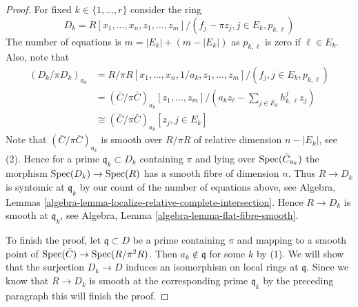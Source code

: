 \begin{proof}
\medskip\noindent
For fixed $k \in \{1, \ldots, r\}$ consider the ring
$$
D_k = R[x_1, \ldots, x_n, z_1, \ldots, z_m]/
(f_j - \pi z_j, j \in E_k, p_{k, \ell})
$$
The number of equations is $m = |E_k| + (m - |E_k|)$ as $p_{k, \ell}$
is zero if $\ell \in E_k$. Also, note that
\begin{align*}
(D_k/\pi D_k)_{a_k}
& =
R/\pi R[x_1, \ldots, x_n, 1/a_k, z_1, \ldots, z_m]/
(f_j, j \in E_k, p_{k, \ell}) \\
& =
(\bar C/\pi \bar C)_{a_k}[z_1, \ldots, z_m]/
(a_kz_\ell - \sum\nolimits_{j \in E_k} h_{k, \ell}^j z_j) \\
& \cong
(\bar C/\pi \bar C)_{a_k}[z_j, j \in E_k]
\end{align*}
Note that $(\bar C/\pi \bar C)_{a_k}$ is smooth over $R/\pi R$
of relative dimension $n - |E_k|$, see (2). Hence for a prime
$\mathfrak q_k \subset D_k$ containing $\pi$ and lying over
$\mathop{\rm Spec}(\bar C_{a_k})$ the morphism $\mathop{\rm Spec}(D_k) \to \mathop{\rm Spec}(R)$
has a smooth fibre of dimension $n$. Thus $R \to D_k$ is syntomic
at $\mathfrak q_k$ by our count of the number of equations above, see
Algebra, Lemmas \ref{algebra-lemma-localize-relative-complete-intersection}.
Hence $R \to D_k$ is smooth at $\mathfrak q_k$, see
Algebra, Lemma \ref{algebra-lemma-flat-fibre-smooth}.

\medskip\noindent
To finish the proof, let $\mathfrak q \subset D$ be a prime
containing $\pi$ and mapping to a smooth point of
$\mathop{\rm Spec}(\bar C) \to \mathop{\rm Spec}(R/\pi^2 R)$. Then $a_k \not \in \mathfrak q$
for some $k$ by (1). We will show that the surjection $D_k \to D$ induces
an isomorphism on local rings at $\mathfrak q$. Since we know that
$R \to D_k$ is smooth at the corresponding prime $\mathfrak q_k$
by the preceding paragraph this will finish the proof.


\end{proof}
